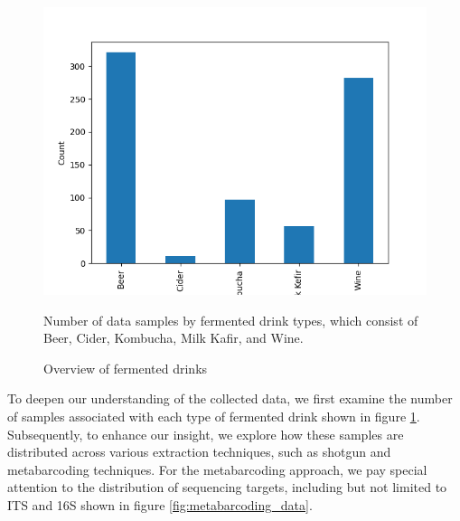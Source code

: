         \begin{figure}[H]
            \centering
            \includegraphics[scale=0.5]{images/methods/data_composition_by_type.png}
            \caption{Overview of fermented drinks}
            \label{fig:methods:data_composition_by_type}
            \small Number of data samples by fermented drink types, which consist of Beer, Cider, Kombucha, Milk Kafir, and Wine.
        \end{figure}

        To deepen our understanding of the collected data, we first examine the number of samples associated with each type of fermented drink shown in figure \ref{fig:methods:data_composition_by_type}. Subsequently, to enhance our insight, we explore how these samples are distributed across various extraction techniques, such as shotgun and metabarcoding techniques. For the metabarcoding approach, we pay special attention to the distribution of sequencing targets, including but not limited to ITS and 16S shown in figure \ref{fig:metabarcoding_data}.

